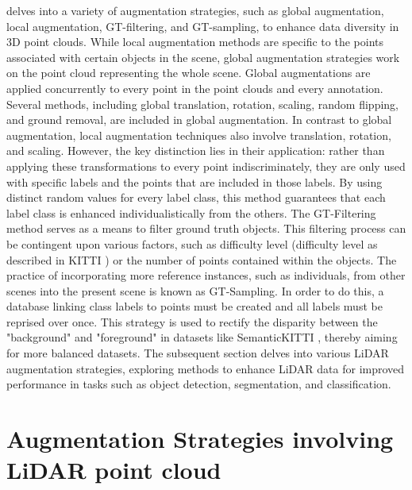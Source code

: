 \parencite{DBLP:journals/corr/abs-2004-01643} delves into a variety of augmentation strategies, such as global augmentation, local augmentation, GT-filtering, and GT-sampling, to enhance data diversity in 3D point clouds. While local augmentation methods are specific to the points associated with certain objects in the scene, global augmentation strategies work on the point cloud representing the whole scene.
Global augmentations are applied concurrently to every point in the point clouds and every annotation. Several methods, including global translation, rotation, scaling, random flipping, and ground removal, are included in global augmentation. In contrast to global augmentation, local augmentation techniques also involve translation, rotation, and scaling. However, the key distinction lies in their application: rather than applying these transformations to every point indiscriminately, they are only used with specific labels and the points that are included in those labels. By using distinct random values for every label class, this method guarantees that each label class is enhanced individualistically from the others.
The GT-Filtering method serves as a means to filter ground truth objects. This filtering process can be contingent upon various factors, such as difficulty level (difficulty level as described in KITTI \parencite{Geiger2012CVPR}) or the number of points contained within the objects. The practice of incorporating more reference instances, such as individuals, from other scenes into the present scene is known as GT-Sampling. In order to do this, a database linking class labels to points must be created and all labels must be reprised over once. This strategy is used to rectify the disparity between the "background" and "foreground" in datasets like SemanticKITTI \parencite{behley2019semantickitti}, thereby aiming for more balanced datasets. The subsequent section delves into various LiDAR augmentation strategies, exploring methods to enhance LiDAR data for improved performance in tasks such as object detection, segmentation, and classification.

\section{Augmentation Strategies involving LiDAR point cloud}

